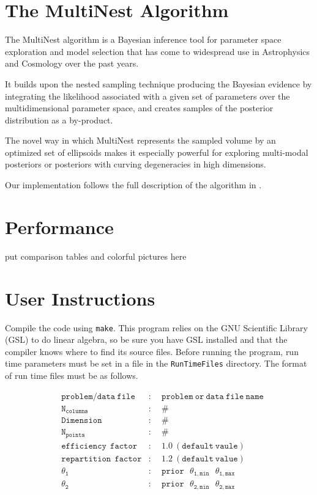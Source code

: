 \documentclass{article}
\def\mtt{\mathtt}
\begin{document}
\section{The MultiNest Algorithm}
The MultiNest algorithm is a Bayesian inference tool for parameter space exploration and model selection that has come to widespread use in Astrophysics and Cosmology over the past years. 

It builds upon the nested sampling technique producing the Bayesian evidence by integrating the likelihood associated with a given set of parameters over the multidimensional parameter space, and creates samples of the posterior distribution as a by-product.

The novel way in which MultiNest represents the sampled volume by an optimized set of ellipsoids makes it especially powerful for exploring multi-modal posteriors or posteriors with curving degeneracies in high dimensions.

Our implementation follows the full description of the algorithm in \cite{2009MNRAS.398.1601F}.
\section{Performance}
put comparison tables and colorful pictures here

\section{User Instructions}
Compile the code using {\tt make}.  This program relies on the GNU Scientific Library (GSL) to do linear algebra, so be sure  you have GSL installed and that the compiler knows where to find its source files. Before running the program, run time parameters must be set in a file in the {\tt RunTimeFiles} directory. The format of run time files must be as follows. 

\begin{align*}
&\mtt{problem/data \ file}                    &:& \ \ \mtt{problem \ or \ data \ file \ name}\\
&\mtt{N_{columns}}  	     &:& \ \ \mtt{\#}\\       
&\mtt{Dimension} 	             &:& \ \ \mtt{\# }\\
&\mtt{N_{points}}                 &:& \ \ \mtt{\#}\\
&\mtt{efficiency \  \ factor}    &:& \ \ \mtt{1.0 \ (default \ vaule)}\\  
&\mtt{repartition \  \ factor}   &:& \ \ \mtt{1.2 \ (default \ value)}\\
&\mtt{\theta_1}                     &:& \ \ \mtt{prior \  \ \  \theta_{1,min}  \  \ \ \theta_{1,max}}\\     
&\mtt{\theta_2}                     &:& \ \ \mtt{prior \  \  \ \theta_{2,min}  \  \ \  \theta_{2,max}}\\     
\end{align*}
\end{document}
